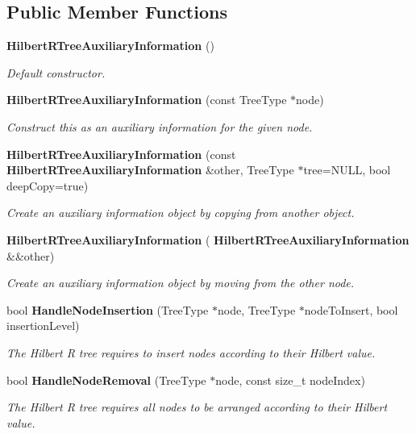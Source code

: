 \subsection*{Public Member Functions}
\begin{DoxyCompactItemize}
\item 
\textbf{ Hilbert\+R\+Tree\+Auxiliary\+Information} ()
\begin{DoxyCompactList}\small\item\em Default constructor. \end{DoxyCompactList}\item 
\textbf{ Hilbert\+R\+Tree\+Auxiliary\+Information} (const Tree\+Type $\ast$node)
\begin{DoxyCompactList}\small\item\em Construct this as an auxiliary information for the given node. \end{DoxyCompactList}\item 
\textbf{ Hilbert\+R\+Tree\+Auxiliary\+Information} (const \textbf{ Hilbert\+R\+Tree\+Auxiliary\+Information} \&other, Tree\+Type $\ast$tree=N\+U\+LL, bool deep\+Copy=true)
\begin{DoxyCompactList}\small\item\em Create an auxiliary information object by copying from another object. \end{DoxyCompactList}\item 
\textbf{ Hilbert\+R\+Tree\+Auxiliary\+Information} (\textbf{ Hilbert\+R\+Tree\+Auxiliary\+Information} \&\&other)
\begin{DoxyCompactList}\small\item\em Create an auxiliary information object by moving from the other node. \end{DoxyCompactList}\item 
bool \textbf{ Handle\+Node\+Insertion} (Tree\+Type $\ast$node, Tree\+Type $\ast$node\+To\+Insert, bool insertion\+Level)
\begin{DoxyCompactList}\small\item\em The Hilbert R tree requires to insert nodes according to their Hilbert value. \end{DoxyCompactList}\item 
bool \textbf{ Handle\+Node\+Removal} (Tree\+Type $\ast$node, const size\+\_\+t node\+Index)
\begin{DoxyCompactList}\small\item\em The Hilbert R tree requires all nodes to be arranged according to their Hilbert value. \end{DoxyCompactList}\item 

\end{DoxyCompactItemize}
